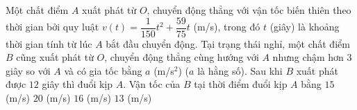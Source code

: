 \begin{ex}%
	Một chất điểm $A$ xuất phát từ $O$, chuyển động thẳng với vận tốc biến thiên theo thời gian bởi quy luật $v(t)=\dfrac{1}{150}t^2+\dfrac{59}{75}t$ (m/s), trong đó $t$ (giây) là khoảng thời gian tính từ lúc $A$ bắt đầu chuyển động. Tại trạng thái nghỉ, một chất điểm $B$ cũng xuất phát  từ $O$, chuyển động thẳng cùng hướng với $A$ nhưng chậm hơn $3$ giây so với $A$ và có gia tốc bằng $a$ (m/s$^2$) ($a$ là hằng số). Sau khi $B$ xuất phát được $12$ giây thì đuổi kịp $A$. Vận tốc của $B$ tại thời điểm đuổi kịp $A$ bằng
	 \choice
		{$15$ (m/s)} 
		{$20$ (m/s)} 
		{\True $16$ (m/s)} 
		{$13$ (m/s)} 
\end{ex}

